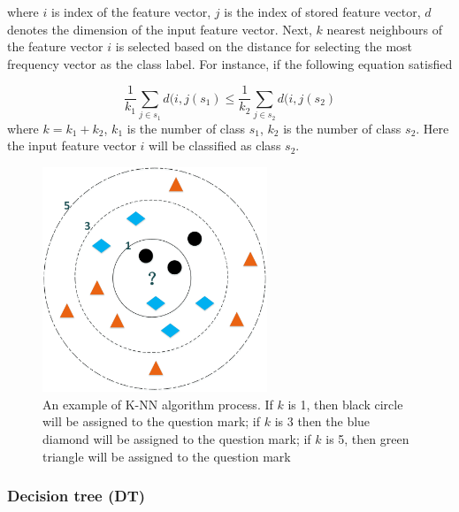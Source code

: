 where $i$ is index of the feature vector, $j$ is the index of stored feature vector, $d$ denotes the dimension of the input feature vector. 
Next, $k$ nearest neighbours of the feature vector $i$ is selected based on the distance for selecting the most frequency vector as the class label. For instance, if the following equation satisfied 

\begin{equation}
\frac{1}{k_{1}}\sum_{j \in s_{1}}d(i,j(s_{1}) \leq \frac{1}{k_{2}}\sum_{j \in s_{2}}d(i,j(s_{2})
\end{equation}
where $k=k_{1}+k_{2}$, $k_{1}$ is the number of class $s_{1}$, $k_{2}$ is the number of class $s_{2}$. Here the input feature vector $i$ will be classified as class $s_{2}$. 



\begin{figure}[htb!]
\centering
\includegraphics[width=0.6\textwidth]{image/Method/KNN.png}
\caption[A K-NN classifier]{An example of K-NN algorithm process. If $k$ is 1, then black circle will be assigned to the question mark; if $k$ is 3 then the blue diamond will be assigned to the question mark; if $k$ is 5, then green triangle will be assigned to the question mark}
\label{fig:K-NN}
\end{figure}




\subsubsection{Decision tree (DT)}


